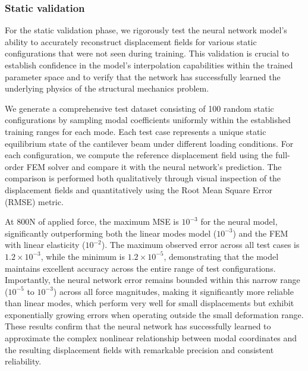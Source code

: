 \subsubsection{Static validation}
\label{sec:static_validation}
For the static validation phase, we rigorously test the neural network model's ability to accurately reconstruct displacement fields for various static configurations that were not seen during training. This validation is crucial to establish confidence in the model's interpolation capabilities within the trained parameter space and to verify that the network has successfully learned the underlying physics of the structural mechanics problem.


We generate a comprehensive test dataset consisting of 100 random static configurations by sampling modal coefficients uniformly within the established training ranges for each mode. Each test case represents a unique static equilibrium state of the cantilever beam under different loading conditions. For each configuration, we compute the reference displacement field using the full-order FEM solver and compare it with the neural network's prediction. The comparison is performed both qualitatively through visual inspection of the displacement fields and quantitatively using the Root Mean Square Error (RMSE) metric.

At 800N of applied force, the maximum MSE is $10^{-3}$ for the neural model, significantly outperforming both the linear modes model ($10^{-3}$) and the FEM with linear elasticity ($10^{-2}$). The maximum observed error across all test cases is $1.2 \times 10^{-3}$, while the minimum is $1.2 \times 10^{-5}$, demonstrating that the model maintains excellent accuracy across the entire range of test configurations. Importantly, the neural network error remains bounded within this narrow range ($10^{-5}$ to $10^{-3}$) across all force magnitudes, making it significantly more reliable than linear modes, which perform very well for small displacements but exhibit exponentially growing errors when operating outside the small deformation range. These results confirm that the neural network has successfully learned to approximate the complex nonlinear relationship between modal coordinates and the resulting displacement fields with remarkable precision and consistent reliability.

